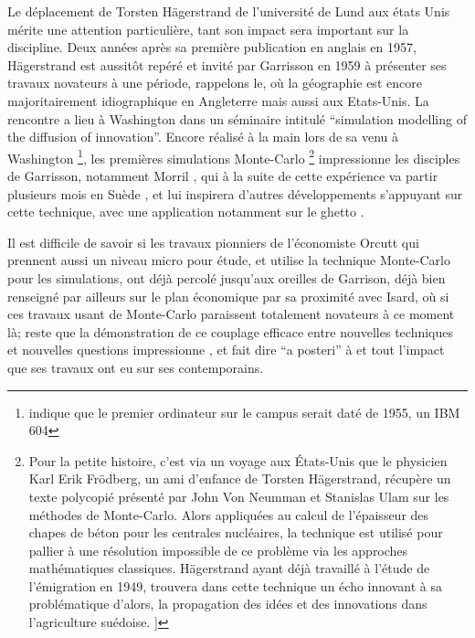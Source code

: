 {Le déplacement de Torsten Hägerstrand de l'université de Lund aux états Unis mérite une attention particulière, tant son impact sera important sur la discipline. Deux années après sa première publication en anglais en 1957, Hägerstrand est aussitôt repéré et invité par Garrisson en 1959 à présenter ses travaux novateurs à une période, rappelons le, où la géographie est encore majoritairement idiographique en Angleterre mais aussi aux Etats-Unis. La rencontre a lieu à Washington dans un séminaire intitulé \foreignquote{english}{simulation modelling of the diffusion of innovation}. Encore réalisé à la main lors de sa venu à Washington \footnote{ \textcite{Barnes2006} indique que le premier ordinateur sur le campus serait daté de 1955, un IBM 604}, les premières simulations Monte-Carlo \footnote{Pour la petite histoire, c'est via un voyage aux États-Unis que le physicien Karl Erik Frödberg, un ami d'enfance de Torsten Hägerstrand, récupère un texte polycopié présenté par John Von Neumman et Stanislas Ulam sur les méthodes de Monte-Carlo. Alors appliquées au calcul de l'épaisseur des chapes de béton pour les centrales nucléaires, la technique est utilisé pour pallier à une résolution impossible de ce problème via les approches mathématiques classiques.  Hägerstrand ayant déjà travaillé à l'étude de l'émigration en 1949, trouvera dans cette technique un écho innovant à sa problématique d'alors, la propagation des idées et des innovations dans l'agriculture suédoise. \autocite[26-28]{Gould2004}]} impressionne les disciples de Garrisson, notamment Morril \autocite[120]{Unwin1992}, qui à la suite de cette expérience va partir plusieurs mois en Suède \autocite{Morril2005}, et lui inspirera d'autres développements s'appuyant sur cette technique, avec une application notamment sur le ghetto \textcite{Marble1972}.

Il est difficile de savoir si les travaux pionniers de l'économiste Orcutt \autocite{Orcutt1957, Orcutt1960} qui prennent aussi un niveau micro pour étude, et utilise la technique Monte-Carlo pour les simulations, ont déjà percolé jusqu'aux oreilles de Garrison, déjà bien renseigné par ailleurs sur le plan économique par sa proximité avec Isard, où si ces travaux usant de Monte-Carlo paraissent totalement novateurs à ce moment là; reste que la démonstration de ce couplage efficace entre nouvelles techniques et nouvelles questions impressionne \autocite[120]{Unwin1992}, et fait dire \foreignquote{latin}{a posteri} à \textcite{Morril2005} et \textcite{Gould1970} tout l'impact que ses travaux ont eu sur ses contemporains.

}
